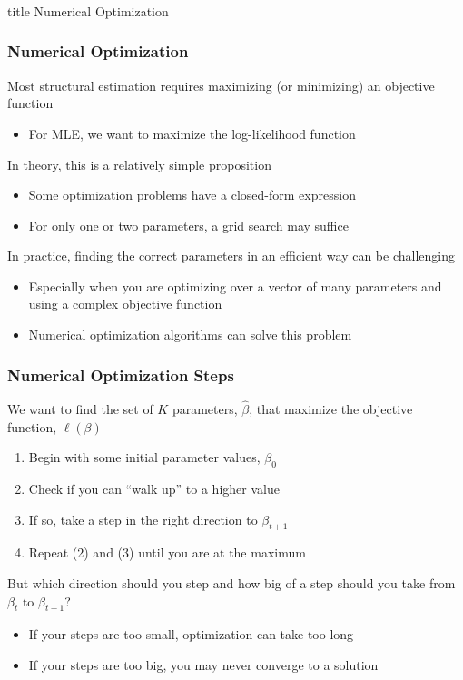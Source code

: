 \documentclass{beamer}\usepackage[]{graphicx}\usepackage[]{color}
\begin{document}
\begin{frame}\frametitle{}
    \vfill
    \centering
    \begin{beamercolorbox}[center]{title}
        \Large Numerical Optimization
    \end{beamercolorbox}
    \vfill
\end{frame}

\begin{frame}\frametitle{Numerical Optimization}
    Most structural estimation requires maximizing (or minimizing) an objective function
    \begin{itemize}
        \item For MLE, we want to maximize the log-likelihood function
    \end{itemize}
    \vspace{3ex}
    In theory, this is a relatively simple proposition
    \begin{itemize}
        \item Some optimization problems have a closed-form expression
        \item For only one or two parameters, a grid search may suffice
    \end{itemize}
    \vspace{3ex}
    In practice, finding the correct parameters in an efficient way can be challenging
    \begin{itemize}
        \item Especially when you are optimizing over a vector of many parameters and using a complex objective function
        \item Numerical optimization algorithms can solve this problem
    \end{itemize}
\end{frame}

\begin{frame}\frametitle{Numerical Optimization Steps}
    We want to find the set of $K$ parameters, $\hat{\beta}$, that maximize the objective function, $\ell(\beta)$
    \begin{enumerate}
        \item Begin with some initial parameter values, $\beta_0$
        \item Check if you can ``walk up'' to a higher value
        \item If so, take a step in the right direction to $\beta_{t + 1}$
        \item Repeat (2) and (3) until you are at the maximum
    \end{enumerate}
    \vspace{3ex}
    But which direction should you step and how big of a step should you take from $\beta_t$ to $\beta_{t + 1}$?
    \begin{itemize}
        \item If your steps are too small, optimization can take too long
        \item If your steps are too big, you may never converge to a solution
    \end{itemize}
\end{frame}
\end{document}
